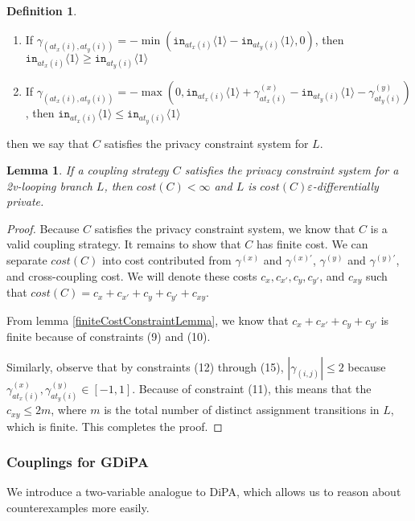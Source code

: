 \documentclass[12pt]{article}
\newcommand{\brangle}[1]{\langle#1 \rangle}
\newtheorem{lemma}[thm]{Lemma}
\theoremstyle{definition}
\newtheorem{defn}[thm]{Definition}
\begin{document}
\begin{defn}
\begin{enumerate}
        \item If $\gamma_{(at_x(i), at_y(i))} = -\min(\texttt{in}_{at_x(i)}\brangle{1}-\texttt{in}_{at_y(i)}\brangle{1}, 0)$, then $\texttt{in}_{at_x(i)}\brangle{1}\geq \texttt{in}_{at_y(i)}\brangle{1}$
        \item If $\gamma_{(at_x(i), at_y(i))} = -\max(0, \texttt{in}_{at_x(i)}\brangle{1}+ \gamma_{at_x(i)}^{(x)}-\texttt{in}_{at_y(i)}\brangle{1}-\gamma_{at_y(i)}^{(y)})$, then $\texttt{in}_{at_x(i)}\brangle{1}\leq \texttt{in}_{at_y(i)}\brangle{1}$
    \end{enumerate}
    then we say that $C$ satisfies the privacy constraint system for $L$. 
\end{defn}


\begin{lemma}
    If a coupling strategy $C$ satisfies the privacy constraint system for a 2v-looping branch $L$, then $cost(C)<\infty$ and $L$ is $cost(C)\varepsilon$-differentially private. 
\end{lemma}

\begin{proof}
    Because $C$ satisfies the privacy constraint system, we know that $C$ is a valid coupling strategy. It remains to show that $C$ has finite cost. We can separate $cost(C)$ into cost contributed from $\gamma^{(x)}$ and $\gamma^{(x)\prime}$, $\gamma^{(y)}$ and $\gamma^{(y)\prime}$, and cross-coupling cost. We will denote these costs $c_x, c_{x\prime}, c_y, c_{y\prime}$, and $c_{xy}$ such that $cost(C) = c_x + c_{x\prime}+c_y+c_{y\prime}+c_{xy}$.

    From lemma \ref{finiteCostConstraintLemma}, we know that $c_x + c_{x\prime}+c_y+c_{y\prime}$ is finite because of constraints (9) and (10). 

    Similarly, observe that by constraints (12) through (15), $|\gamma_{(i, j)}|\leq 2$ because $\gamma_{at_x(i)}^{(x)},\gamma_{at_y(i)}^{(y)}\in [-1, 1]$. Because of constraint (11), this means that the $c_{xy}\leq 2m$, where $m$ is the total number of distinct assignment transitions in $L$, which is finite. This completes the proof.
\end{proof}

\subsubsection{Couplings for GDiPA}

We introduce a two-variable analogue to DiPA, which allows us to reason about counterexamples more easily. 
\end{document}
